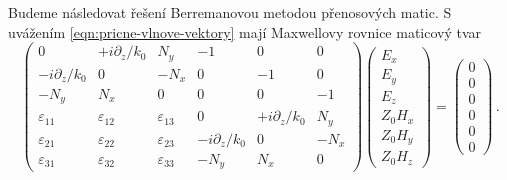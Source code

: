 Budeme následovat řešení Berremanovou metodou přenosových matic\cite{berremanOpticsStratifiedAnisotropic1972}.
S uvážením \eqref{eqn:pricne-vlnove-vektory} mají Maxwellovy rovnice maticový tvar
\begin{equation}
\label{eqn:Berreman-6x6}
    \begin{pmatrix}
        0 & +i\partial_z/k_0 & N_y & -1 & 0 & 0 \\
        -i\partial_z/k_0 & 0 & -N_x & 0 & -1 & 0 \\
        -N_y & N_x & 0 & 0 & 0 & -1 \\
        \varepsilon_{11} & \varepsilon_{12} & \varepsilon_{13} & 0 & +i\partial_z/k_0 & N_y \\
        \varepsilon_{21} & \varepsilon_{22} & \varepsilon_{23} & -i\partial_z/k_0 & 0 & -N_x \\
        \varepsilon_{31} & \varepsilon_{32} & \varepsilon_{33} & -N_y & N_x & 0
    \end{pmatrix}
    \begin{pmatrix}
        E_x \\ E_y \\ E_z \\ Z_0 H_x \\ Z_0 H_y \\ Z_0 H_z
    \end{pmatrix} = \begin{pmatrix} 0 \\ 0 \\ 0 \\ 0 \\ 0 \\ 0 \end{pmatrix} \,.
\end{equation}

